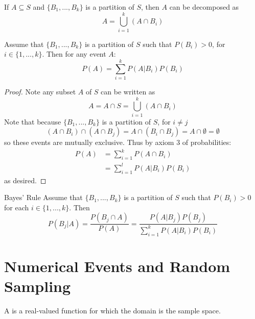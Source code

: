 \documentclass[12pt, a4paper, twoside, openright, titlepage]{book}
\begin{document}
\begin{rmk}{}{}
    If $A \subseteq S$ and $\{B_1,...,B_k\}$ is a partition of $S$, then $A$ can be decomposed as \begin{equation*}
        A = \bigcup\limits_{i=1}^k(A\cap B_i)
    \end{equation*}
\end{rmk}


\begin{thm}{}{}
    Assume that $\{B_1,...,B_k\}$ is a partition of $S$ such that $P(B_i) > 0$, for $i \in \{1,...,k\}$. Then for any event $A$:\begin{equation*}
        P(A) = \sum\limits_{i=1}^kP(A\vert B_i)P(B_i)
    \end{equation*}
\end{thm}
\begin{proof}{}{}
    Note any subset $A$ of $S$ can be written as \begin{equation*}
        A = A\cap S = \bigcup\limits_{i=1}^k(A\cap B_i)
    \end{equation*}
    Note that because $\{B_1,...,B_k\}$ is a partition of $S$, for $i \neq j$\begin{equation*}
        (A\cap B_i)\cap(A\cap B_j) = A\cap(B_i\cap B_j) = A\cap \emptyset = \emptyset
    \end{equation*}
    so these events are mutually exclusive. Thus by axiom $3$ of probabilities: \begin{align*}
        P(A) &= \sum\limits_{i=1}^kP(A\cap B_i) \\
        &= \sum\limits_{i=1}^lP(A\vert B_i)P(B_i)
    \end{align*}
    as desired.
\end{proof}


\begin{namthm}{Bayes' Rule}{}
    Assume that $\{B_1,...,B_k\}$ is a partition of $S$ such that $P(B_i) > 0$ for each $i \in \{1,...,k\}$. Then \begin{equation}
        P(B_j\vert A) = \frac{P(B_j\cap A)}{P(A)} = \frac{P(A\vert B_j)P(B_j)}{\sum_{i=1}^kP(A\vert B_i)P(B_i)}
    \end{equation}
\end{namthm}


\section{\textsection Numerical Events and Random Sampling}

\begin{defn}{}{}
    A  is a real-valued function for which the domain is the sample space.
\end{defn}
\end{document}
